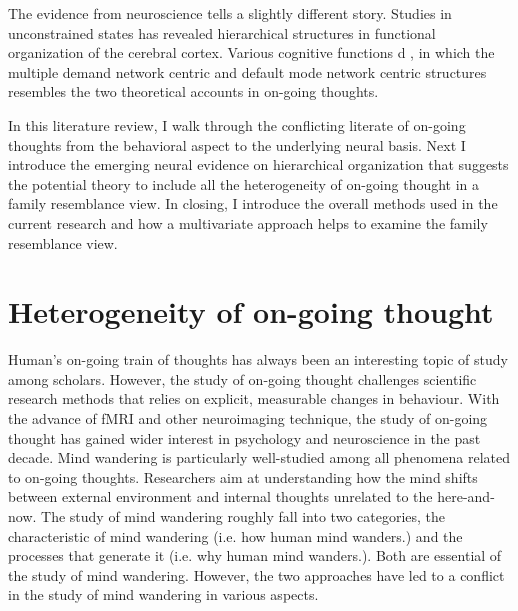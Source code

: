 The evidence from neuroscience tells a slightly different story. Studies in unconstrained states has revealed hierarchical structures in functional organization of the cerebral cortex. Various cognitive functions d 
, in which the multiple demand network centric and default mode network centric structures resembles the two theoretical accounts in on-going thoughts. 

In this literature review, I walk through the conflicting literate of on-going thoughts from the behavioral aspect to the underlying neural basis. Next I introduce the emerging neural evidence on hierarchical organization that suggests the potential theory to include all the heterogeneity of on-going thought in a family resemblance view. In closing, I introduce the overall methods used in the current research and how a multivariate approach helps to examine the family resemblance view.

\section{Heterogeneity of on-going thought}

Human's on-going train of thoughts has always been an interesting topic of study among scholars. However, the study of on-going thought challenges scientific research methods that relies on explicit, measurable changes in behaviour. With the advance of fMRI and other neuroimaging technique, the study of on-going thought has gained wider interest in psychology and neuroscience in the past decade. Mind wandering is particularly well-studied among all phenomena related to on-going thoughts. Researchers aim at understanding how the mind shifts between external environment and internal thoughts unrelated to the here-and-now. The study of mind wandering roughly fall into two categories, the characteristic of mind wandering (i.e. how human mind wanders.) and the processes that generate it (i.e. why human mind wanders.). Both are essential of the study of mind wandering. However, the two approaches have led to a conflict in the study of mind wandering in various aspects.


